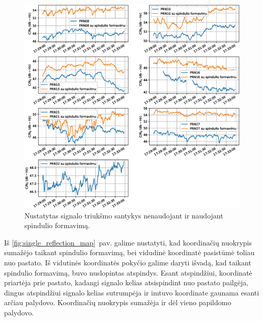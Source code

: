 \documentclass[main.tex]{subfiles}
\begin{document}
\begin{figure}[ht]
    \begin{centering}
    \includegraphics[scale=0.6]{drawings/one_reflection_snr}
    \par\end{centering}
    \protect\caption{\label{fig:single_reflection_snr}Nustatytas signalo triukšmo santykys nenaudojant ir naudojant spindulio formavimą.}
\end{figure}

Iš \ref{fig:single_reflection_map}~pav. galime nustatyti, kad koordinačių nuokrypis sumažėjo taikant spindulio
formavimą, bei vidudinė koordinatė pasistūmė toliau nuo pastato. Iš vidutinės koordinatės pokyčio
galime daryti išvadą, kad taikant spindulio formavimą, buvo nuslopintas atspindys. Esant atspindžiui,
koordinatė priartėja prie pastato, kadangi signalo kelias atsispindint nuo pastato pailgėja, dingus
atspindžiui signalo kelias sutrumpėja ir imtuvo koordinate gaunama esanti arčiau palydovo.
Koordinačių nuokrypis sumažėja ir dėl vieno papildomo palydovo.
\end{document}
